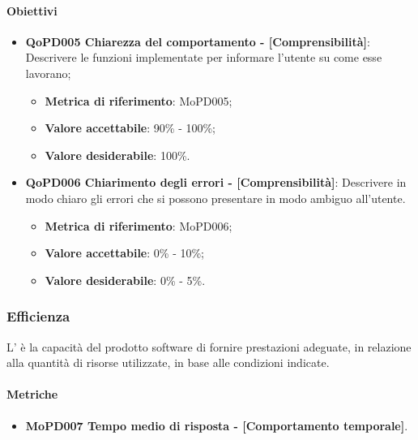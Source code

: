 \documentclass[../piano-di-qualifica.tex]{subfiles}
\begin{document}
\paragraph{Obiettivi}
\label{sub:obiettivi}
\begin{itemize}
    \item \textbf{QoPD005 Chiarezza del comportamento - [Comprensibilità]}: Descrivere le funzioni implementate per informare l'utente su come esse lavorano;
        \begin{itemize}
            \item \textbf{Metrica di riferimento}: MoPD005;
            \item \textbf{Valore accettabile}: 90\% - 100\%;
            \item \textbf{Valore desiderabile}: 100\%.
        \end{itemize}
    \item \textbf{QoPD006 Chiarimento degli errori - [Comprensibilità]}: Descrivere in modo chiaro gli errori che si possono presentare in modo ambiguo all'utente.
        \begin{itemize}
            \item \textbf{Metrica di riferimento}: MoPD006;
            \item \textbf{Valore accettabile}: 0\% - 10\%;
            \item \textbf{Valore desiderabile}: 0\% - 5\%.
        \end{itemize}
\end{itemize}

\subsubsection{Efficienza}%
\label{sub:efficienza}
L' è la capacità del prodotto software di fornire prestazioni adeguate, in relazione alla quantità di
risorse utilizzate, in base alle condizioni indicate.

\paragraph{Metriche}
\label{sub:metriche}
\begin{itemize}
    \item \textbf{MoPD007 Tempo medio di risposta - [Comportamento temporale]}.
\end{itemize}
\end{document}
